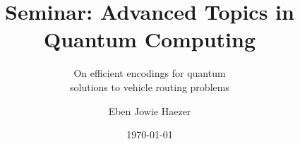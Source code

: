 \documentclass {beamer}
\title	{
	Seminar: Advanced Topics in \\
	Quantum Computing \\
}
\subtitle {
	On efficient encodings for quantum \\
	solutions to vehicle routing problems
}
\author {Eben Jowie Haezer}
\date {\today}
\begin{document}
\maketitle

\begin {frame}

\end {frame}
\end{document}
